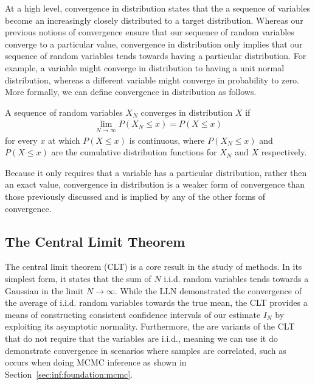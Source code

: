 At a  high level, convergence in distribution states that the a sequence of variables become
an increasingly closely distributed to a target distribution.  Whereas our previous notions of
convergence ensure that our sequence of random variables converge to a particular value, 
convergence in distribution only implies that our sequence of random variables tends towards
having a particular distribution.  For example, a variable might converge in distribution to
having a unit normal distribution, whereas a different variable might converge in probability
to zero. More formally, we can define convergence in distribution as follows.
\begin{definition}
	A sequence of random variables $X_N$ converges in distribution $X$  if
	\begin{align}
		\lim\limits_{N\rightarrow\infty} P(X_N \le x) = P(X \le x)
	\end{align}
	for every $x$ at which $P(X\le x)$ is continuous, where $P(X_N \le x) $ and $P(X \le x)$
	are the cumulative distribution functions for $X_N$ and $X$ respectively.
\end{definition}
 Because it only requires that a variable has a particular distribution, rather then an
 exact value, convergence in distribution is a weaker form of convergence than those previously
 discussed and is implied by any of the other forms of convergence.  

\subsection{The Central Limit Theorem}
\label{sec:inf:mc:clt}

The central limit theorem (CLT) is a core result in the study of \mc methods.  In its simplest form,
it states that the sum of $N$ i.i.d. random variables tends towards a Gaussian in the limit $N\to\infty$.
While the LLN demonstrated the convergence of the average of i.i.d. random variables towards
the true mean, the CLT provides a means of constructing consistent confidence intervals of our estimate
$I_N$ by exploiting its asymptotic normality.  Furthermore, the are variants of the CLT that do not
require that the variables are i.i.d., meaning we can use it do demonstrate convergence in scenarios
where samples are correlated, such as occurs when doing MCMC inference as shown in
Section~\ref{sec:inf:foundation:mcmc}.

